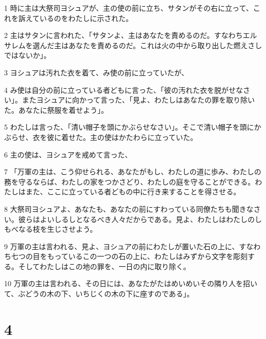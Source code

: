 \par 1 時に主は大祭司ヨシュアが、主の使の前に立ち、サタンがその右に立って、これを訴えているのをわたしに示された。
\par 2 主はサタンに言われた、「サタンよ、主はあなたを責めるのだ。すなわちエルサレムを選んだ主はあなたを責めるのだ。これは火の中から取り出した燃えさしではないか」。
\par 3 ヨシュアは汚れた衣を着て、み使の前に立っていたが、
\par 4 み使は自分の前に立っている者どもに言った、「彼の汚れた衣を脱がせなさい」。またヨシュアに向かって言った、「見よ、わたしはあなたの罪を取り除いた。あなたに祭服を着せよう」。
\par 5 わたしは言った、「清い帽子を頭にかぶらせなさい」。そこで清い帽子を頭にかぶらせ、衣を彼に着せた。主の使はかたわらに立っていた。
\par 6 主の使は、ヨシュアを戒めて言った、
\par 7 「万軍の主は、こう仰せられる、あなたがもし、わたしの道に歩み、わたしの務を守るならば、わたしの家をつかさどり、わたしの庭を守ることができる。わたしはまた、ここに立っている者どもの中に行き来することを得させる。
\par 8 大祭司ヨシュアよ、あなたも、あなたの前にすわっている同僚たちも聞きなさい。彼らはよいしるしとなるべき人々だからである。見よ、わたしはわたしのしもべなる枝を生じさせよう。
\par 9 万軍の主は言われる、見よ、ヨシュアの前にわたしが置いた石の上に、すなわち七つの目をもっているこの一つの石の上に、わたしはみずから文字を彫刻する。そしてわたしはこの地の罪を、一日の内に取り除く。
\par 10 万軍の主は言われる、その日には、あなたがたはめいめいその隣り人を招いて、ぶどうの木の下、いちじくの木の下に座すのである」。

\chapter{4}

